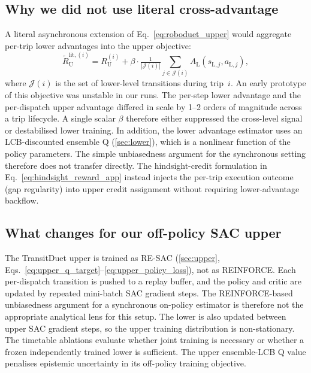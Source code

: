 \subsection{Why we did not use literal cross-advantage}

A literal asynchronous extension of Eq.~\eqref{eq:roboduet_upper} would aggregate per-trip lower advantages into the upper objective:
\begin{equation}
  \tilde{R}^{\text{lit},(i)}_{\mathrm{U}} = R_{\mathrm{U}}^{(i)} + \beta \cdot \tfrac{1}{|\mathcal{J}(i)|}\sum_{j \in \mathcal{J}(i)} A_{\mathrm{L}}(s_{\mathrm{L},j}, a_{\mathrm{L},j}),
  \label{eq:cross_adv_literal}
\end{equation}
where $\mathcal{J}(i)$ is the set of lower-level transitions during trip~$i$. An early prototype of this objective was unstable in our runs. The per-step lower advantage and the per-dispatch upper advantage differed in scale by 1--2 orders of magnitude across a trip lifecycle. A single scalar $\beta$ therefore either suppressed the cross-level signal or destabilised lower training. In addition, the lower advantage estimator uses an LCB-discounted ensemble Q (\cref{sec:lower}), which is a nonlinear function of the policy parameters. The simple unbiasedness argument for the synchronous setting therefore does not transfer directly. The hindsight-credit formulation in Eq.~\eqref{eq:hindsight_reward_app} instead injects the per-trip execution outcome (gap regularity) into upper credit assignment without requiring lower-advantage backflow.

\subsection{What changes for our off-policy SAC upper}
The TransitDuet upper is trained as RE-SAC (\cref{sec:upper}, Eqs.~\ref{eq:upper_q_target}--\ref{eq:upper_policy_loss}), not as REINFORCE. Each per-dispatch transition is pushed to a replay buffer, and the policy and critic are updated by repeated mini-batch SAC gradient steps. The REINFORCE-based unbiasedness argument for a synchronous on-policy estimator is therefore not the appropriate analytical lens for this setup. The lower is also updated between upper SAC gradient steps, so the upper training distribution is non-stationary. The timetable ablations evaluate whether joint training is necessary or whether a frozen independently trained lower is sufficient. The upper ensemble-LCB Q value penalises epistemic uncertainty in its off-policy training objective.

